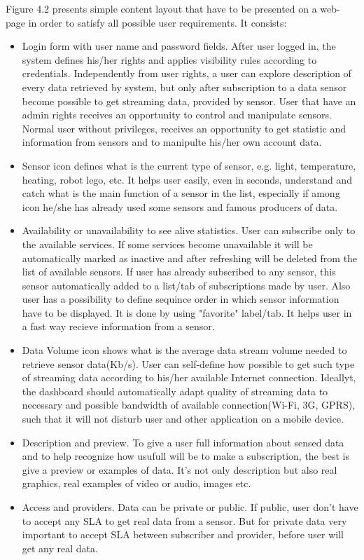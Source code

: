     Figure 4.2 presents simple content layout that have to be presented on a web-page in order to satisfy all possible user requirements. It consists:
      \begin{itemize}
      \item Login form with user name and password fields. After user logged in, the system defines his/her rights and applies visibility rules according to credentials. Independently from user rights, a user can explore description of every data retrieved by system, but only after subscription to a data sensor become possible to get streaming data, provided by sensor. User that have an admin rights receives an opportunity to control and manipulate sensors. Normal user without privileges, receives an opportunity to get statistic and information from sensors and to manipulte his/her own account data.
      \item Sensor icon defines what is the current type of sensor, e.g. light, temperature, heating, robot lego, etc. It helps user easily, even in seconds, understand and catch what is the main function of a sensor in the list, especially if among icon he/she has already used some sensors and famous producers of data.
      \item Availability or unavailability to see alive statistics. User can subscribe only to the available services. If some services become unavailable it will be automatically marked as inactive and after refreshing will be deleted from the list of available sensors. If user has already subscribed to any sensor, this sensor automatically added to a list/tab of subscriptions made by user. Also user has a possibility to define sequince order in which sensor information have to be displayed. It is done by using "favorite" label/tab. It helps user in a fast way recieve information from a sensor.
      \item Data Volume icon shows what is the average data stream volume needed to retrieve sensor data(Kb/s). User can self-define how possible to get such type of streaming data according to his/her available Internet connection. Ideallyt, the dashboard should automatically adapt quality of streaming data to necessary and possible bandwidth of available connection(Wi-Fi, 3G, GPRS), such that it will not disturb user and other application on a mobile device.
      \item Description and preview. To give a user full information about sensed data and to help recognize how usufull will be to make a subscription, the best is give a preview or examples of data. It's not only description but also real graphics, real examples of video or audio, images etc.
      \item Access and providers. Data can be private or public. If public, user don't have to accept any SLA to get real data from a sensor. But for private data very important to accept SLA between subscriber and provider, before user will get any real data.
      \end{itemize}

